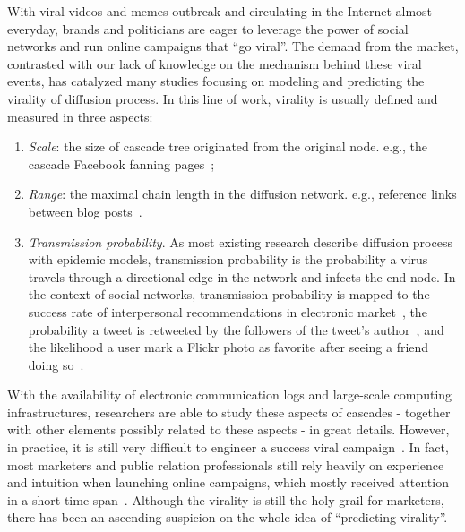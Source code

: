 \documentclass[phd,tocprelim]{cornell}
\begin{document}
With viral videos and memes outbreak and circulating in the Internet almost everyday, brands and politicians are eager to leverage the power of social networks and run online campaigns that ``go viral''. The demand from the market, contrasted with our lack of knowledge on the mechanism behind these viral events, has catalyzed many studies focusing on modeling and predicting the virality of diffusion process. In this line of work, virality is usually defined and measured in three aspects: 
\begin{enumerate}
\item \emph{Scale}: the size of cascade tree originated from the original node.
e.g., the cascade Facebook fanning pages~\cite{Sun-2009};
\item \emph{Range}: the maximal chain length in the diffusion network. e.g., reference links between blog posts~\cite{Leskovec-SDM-07}. 
\item \emph{Transmission probability}. As most existing research describe diffusion process with epidemic models, transmission probability is the probability a virus travels through a directional edge in the network and infects the end node. In the context of social networks, transmission probability is mapped to  the success rate of interpersonal recommendations in electronic market~\cite{Leskovec-EC-2006}, the probability a tweet is retweeted by the followers of the tweet's author~\cite{Bakshy-2011}, and the likelihood a user mark a Flickr photo as favorite after seeing a friend doing so~\cite{Cha-2009}.
\end{enumerate}

With the availability of electronic communication logs and large-scale computing infrastructures, researchers are able to study these aspects of cascades - together with other elements possibly related to these aspects - in great details. 
However, in practice, it is still very difficult to engineer a success viral campaign~\cite{Bakshy-2011}. In fact, most marketers and public relation professionals still rely heavily on experience and intuition when launching online campaigns, which mostly received attention in a short time span~\cite{Yang-2011,crane:2008,Wu-ICWSM-2011,Wu-Twitter-2011}. Although the virality is still the holy grail for marketers, there has been an ascending suspicion on the whole idea of ``predicting virality''.
\end{document}

